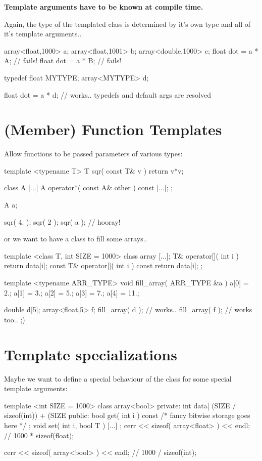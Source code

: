 {\bfseries{Template arguments have to be known at compile time.}}

Again, the type of the templated class is determined
by it's own type and all of it's template arguments..

\begin{myverbatim}
array<float,1000> a;
array<float,1001> b;
array<double,1000> c;
float dot = a * A; // fails!
float dot = a * B; // fails!

typedef float MYTYPE;
array<MYTYPE> d;

float dot = a * d;
// works.. typedefs and default args are resolved
\end{myverbatim}



\section{(Member) Function Templates}
Allow functions to be passed parameters of various types:
\begin{myverbatim}
template <typename T>
T sqr( const T& v ) { return v*v; }

class A {
  [...]
  A operator*( const A& other ) const { [...]; }
};

A a;

sqr( 4. );
sqr( 2 );
sqr( a ); // hooray!
\end{myverbatim}

or we want to have a class to fill some arrays..
\begin{myverbatim}
template <class T, int SIZE = 1000>
class array {
  [...];
  T& operator[]( int i ) { return data[i]; }
  const T& operator[]( int i ) const { return data[i]; }
};

template <typename ARR_TYPE>
void fill_array( ARR_TYPE &a ) {
  a[0] = 2.;  a[1] = 3.;  a[2] = 5.;  a[3] = 7.;  a[4] = 11.;
}

double d[5];
array<float,5> f;
fill_array( d ); // works..
fill_array( f ); // works too.. ;)
\end{myverbatim}



\section{Template specializations}

Maybe we want to define a special behaviour of the class for
some special template arguments:

\begin{myverbatim}
template <int SIZE = 1000>
class array<bool> {
  private:
    int data[ (SIZE / sizeof(int)) + (SIZE %
  public:
    bool get( int i ) const { /* fancy bitwise storage goes here */ };
    void set( int i, bool T ) { [...] }
};
cerr << sizeof( array<float> ) << endl;
// 1000 * sizeof(float);

cerr << sizeof( array<bool> ) << endl;
// 1000 / sizeof(int);
\end{myverbatim}


